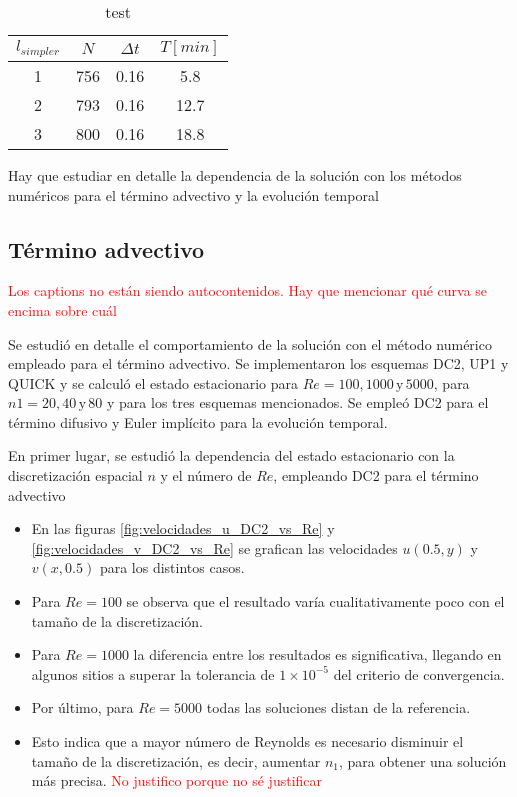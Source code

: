 \documentclass[aps,prb,twocolumn,superscriptaddress,floatfix,longbibliography,10pt]{revtex4-2}
\newif\ifptitle
\newif\ifpnumber
\newcounter{para}
\newcommand\ptitle[1]{\par\refstepcounter{para}
{\ifpnumber{\noindent\textcolor{lightgray}{\textbf{\thepara}}\indent}\fi}
{\ifptitle{\textbf{[{#1}]}}\fi}}
\begin{document}
\begin{table}[]
  \begin{tabular}{|c|c|c|c|}
  \hline
  \multicolumn{1}{|c|}{$l_{simpler}$ \quad} & \multicolumn{1}{c|}{$N$\quad} & \multicolumn{1}{c|}{$\Delta t$\quad} & \multicolumn{1}{c|}{$T [min]$} \\ \hline
  1 & 756 & 0.16 & 5.8 \\ \hline
  2 & 793 & 0.16 & 12.7 \\ \hline
  3 & 800 & 0.16 & 18.8 \\ \hline
  \end{tabular}
  \label{tabla:dt_costo_vs_lsimpler}
  \caption{test}
\end{table}

Hay que estudiar en detalle la dependencia de la solución con los métodos numéricos para el término advectivo y la evolución temporal


\subsection{Término advectivo}

\textcolor{red}{Los captions no están siendo autocontenidos. Hay que mencionar qué curva se encima sobre cuál}

Se estudió en detalle el comportamiento de la solución con el método numérico empleado para el término advectivo. Se implementaron los esquemas DC2, UP1 y QUICK y se calculó el estado estacionario para $Re = 100, 1000 \, \mathrm{y} \, 5000$, para $n1 = 20, 40 \, \mathrm{y} \, 80$ y para los tres esquemas mencionados. Se empleó DC2 para el término difusivo y Euler implícito para la evolución temporal.

\ptitle{Comparación DC2 vs n1 para distintos Re}
En primer lugar, se estudió la dependencia del estado estacionario con la discretización espacial $n$ y el número de $Re$, empleando DC2 para el término advectivo
\begin{itemize}
  \item En las figuras \ref{fig:velocidades_u_DC2_vs_Re} y \ref{fig:velocidades_v_DC2_vs_Re} se grafican las velocidades $u(0.5,y)$ y $v(x,0.5)$ para los distintos casos.
  \item Para $Re = 100$ se observa que el resultado varía cualitativamente poco con el tamaño de la discretización.
  \item Para $Re = 1000$ la diferencia entre los resultados es significativa, llegando en algunos sitios a superar la tolerancia de $1 \times 10^{-5}$ del criterio de convergencia.
  \item Por último, para $Re = 5000$ todas las soluciones distan de la referencia.
  \item Esto indica que a mayor número de Reynolds es necesario disminuir el tamaño de la discretización, es decir, aumentar $n_1$, para obtener una solución más precisa. \textcolor{red}{No justifico porque no sé justificar}
\end{itemize}
\end{document}
